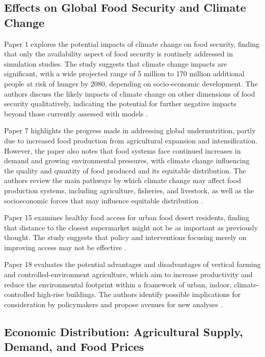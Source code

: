 \documentclass{article}
\begin{document}
\subsection{Effects on Global Food Security and Climate Change}

Paper 1 explores the potential impacts of climate change on food security, finding that only the availability aspect of food security is routinely addressed in simulation studies. The study suggests that climate change impacts are significant, with a wide projected range of 5 million to 170 million additional people at risk of hunger by 2080, depending on socio-economic development. The authors discuss the likely impacts of climate change on other dimensions of food security qualitatively, indicating the potential for further negative impacts beyond those currently assessed with models \cite{Mcnaughton2013TheIA}.

Paper 7 highlights the progress made in addressing global undernutrition, partly due to increased food production from agricultural expansion and intensification. However, the paper also notes that food systems face continued increases in demand and growing environmental pressures, with climate change influencing the quality and quantity of food produced and its equitable distribution. The authors review the main pathways by which climate change may affect food production systems, including agriculture, fisheries, and livestock, as well as the socioeconomic forces that may influence equitable distribution \cite{Bradshaw2010TheIP}.

Paper 15 examines healthy food access for urban food desert residents, finding that distance to the closest supermarket might not be as important as previously thought. The study suggests that policy and interventions focusing merely on improving access may not be effective \cite{Kohnov2019InternalFS}.

Paper 18 evaluates the potential advantages and disadvantages of vertical farming and controlled-environment agriculture, which aim to increase productivity and reduce the environmental footprint within a framework of urban, indoor, climate-controlled high-rise buildings. The authors identify possible implications for consideration by policymakers and propose avenues for new analyses \cite{Ballardini2018PrintingSP}.

\subsection{Economic Distribution: Agricultural Supply, Demand, and Food Prices}
\end{document}
